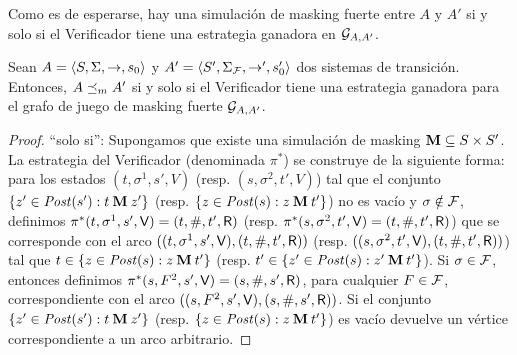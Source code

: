 Como es de esperarse, hay una simulación de masking fuerte entre $A$ y $A'$
si y solo si el Verificador tiene una estrategia ganadora en $\mathcal{G}_{A, A'}$.

\begin{theorem} \label{thm:wingame_strat}
  Sean $A=\langle S, \Sigma, \rightarrow, s_0 \rangle$ y $A'=\langle S', \Sigma_{\mathcal{F}}, \rightarrow', s'_0 \rangle$ dos sistemas de transición.
  Entonces, $A \preceq_{m} A'$ si y solo si el Verificador tiene una estrategia ganadora para el grafo de juego de masking fuerte $\mathcal{G}_{A, A'}$.
\end{theorem}
\begin{proof} 
	``solo si'': Supongamos que existe una simulación de masking $\mathbin{\mathbf{M}} \subseteq S \times S'$.
La estrategia del Verificador (denominada $\pi^*$) se construye de la siguiente forma:  para los estados $(t, \sigma^1, s', V)$ (resp. $(s, \sigma^2, t', V)$) tal que el conjunto $\{ z' \in \mathit{Post}(s'): t \mathbin{\mathbf{M}} z' \}$
(resp. $\{ z \in \mathit{Post}(s): z \mathbin{\mathbf{M}} t' \}$) no es vacío y $\sigma \notin \mathcal{F}$, definimos $\pi^*(t, \sigma^1, s', \mathsf{V}) = (t, \#, t', \mathsf{R})$ 
(resp. $\pi^*(s, \sigma^2, t', \mathsf{V}) = (t, \#, t', \mathsf{R})$) que se corresponde con el arco $((t, \sigma^1, s', \mathsf{V}), (t, \#, t', \mathsf{R}))$ (resp. $((s, \sigma^2, t', \mathsf{V}),(t, \#, t', \mathsf{R}))$) tal que $t \in \{ z \in \mathit{Post}(s): z \mathbin{\mathbf{M}} t' \}$ (resp. $t' \in \{ z' \in \mathit{Post}(s): z' \mathbin{\mathbf{M}} t' \}$).  Si $\sigma \in \mathcal{F}$, entonces definimos $\pi^*(s, F^2, s', \mathsf{V}) = (s, \#, s', \mathsf{R})$, para cualquier $F \in \mathcal{F}$, correspondiente con el arco $((s, F^2, s', \mathsf{V}),( s, \#, s', \mathsf{R}))$. Si el conjunto $\{ z' \in \mathit{Post}(s'): t \mathbin{\mathbf{M}} z' \}$  (resp. $\{ z \in \mathit{Post}(s): z \mathbin{\mathbf{M}} t' \}$) 
es vacío devuelve un vértice correspondiente a un arco arbitrario. 


\end{proof}
